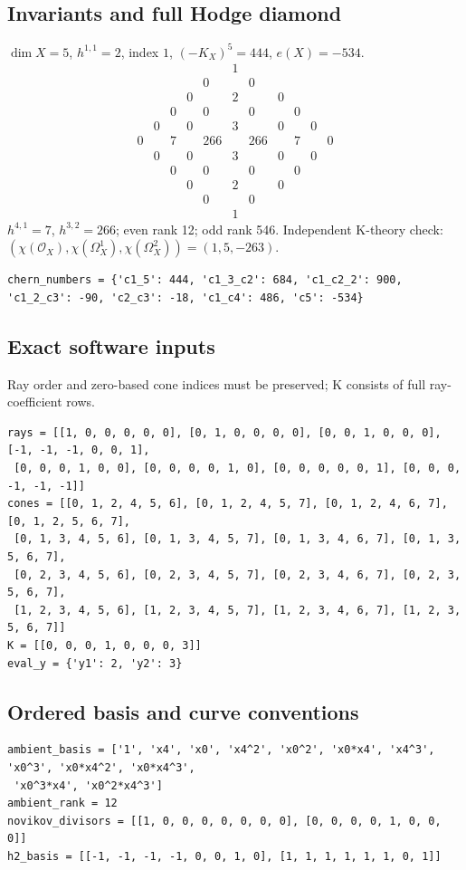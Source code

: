 \documentclass[10pt,a4paper]{article}
\begin{document}
\subsection*{Invariants and full Hodge diamond}
$\dim X=5$, $h^{1,1}=2$, index $1$, $(-K_X)^5=444$, $e(X)=-534$.
\[\begin{array}{ccccccccccc}&&&&&1&&&&&\\&&&&0&&0&&&&\\&&&0&&2&&0&&&\\&&0&&0&&0&&0&&\\&0&&0&&3&&0&&0&\\0&&7&&266&&266&&7&&0\\&0&&0&&3&&0&&0&\\&&0&&0&&0&&0&&\\&&&0&&2&&0&&&\\&&&&0&&0&&&&\\&&&&&1&&&&&\end{array}\]
$h^{4,1}=7$, $h^{3,2}=266$; even rank 12; odd rank 546.
Independent K-theory check: $(\chi(\mathcal O_X),\chi(\Omega_X^1),\chi(\Omega_X^2))=(1, 5, -263)$.
\begin{lstlisting}
chern_numbers = {'c1_5': 444, 'c1_3_c2': 684, 'c1_c2_2': 900, 'c1_2_c3': -90, 'c2_c3': -18, 'c1_c4': 486, 'c5': -534}
\end{lstlisting}
\subsection*{Exact software inputs}
Ray order and zero-based cone indices must be preserved; K consists of full ray-coefficient rows.
\begin{lstlisting}
rays = [[1, 0, 0, 0, 0, 0], [0, 1, 0, 0, 0, 0], [0, 0, 1, 0, 0, 0], [-1, -1, -1, 0, 0, 1],
 [0, 0, 0, 1, 0, 0], [0, 0, 0, 0, 1, 0], [0, 0, 0, 0, 0, 1], [0, 0, 0, -1, -1, -1]]
cones = [[0, 1, 2, 4, 5, 6], [0, 1, 2, 4, 5, 7], [0, 1, 2, 4, 6, 7], [0, 1, 2, 5, 6, 7],
 [0, 1, 3, 4, 5, 6], [0, 1, 3, 4, 5, 7], [0, 1, 3, 4, 6, 7], [0, 1, 3, 5, 6, 7],
 [0, 2, 3, 4, 5, 6], [0, 2, 3, 4, 5, 7], [0, 2, 3, 4, 6, 7], [0, 2, 3, 5, 6, 7],
 [1, 2, 3, 4, 5, 6], [1, 2, 3, 4, 5, 7], [1, 2, 3, 4, 6, 7], [1, 2, 3, 5, 6, 7]]
K = [[0, 0, 0, 1, 0, 0, 0, 3]]
eval_y = {'y1': 2, 'y2': 3}
\end{lstlisting}
\subsection*{Ordered basis and curve conventions}
\begin{lstlisting}
ambient_basis = ['1', 'x4', 'x0', 'x4^2', 'x0^2', 'x0*x4', 'x4^3', 'x0^3', 'x0*x4^2', 'x0*x4^3',
 'x0^3*x4', 'x0^2*x4^3']
ambient_rank = 12
novikov_divisors = [[1, 0, 0, 0, 0, 0, 0, 0], [0, 0, 0, 0, 1, 0, 0, 0]]
h2_basis = [[-1, -1, -1, -1, 0, 0, 1, 0], [1, 1, 1, 1, 1, 1, 0, 1]]
\end{lstlisting}
\end{document}
